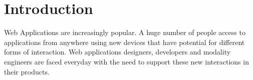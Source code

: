 \documentclass{llncs}
\begin{document}
\mainmatter  %

\title{}
\subtitle{\textbf{Technical Draft}}


%
%
\author{Diego Paez}
%


%
%

\maketitle


\begin{abstract}
Here we are introducing a novel platform that expands, what we called, the common set of interactions on web applications. Further more, this platform not only helps to increase this set, but also adds multimodal interactions capabilities to web applications. The way the multimodal interaction is supported is based on a different approach introduced here as a distributed fusion system.
\end{abstract}

\section{Introduction}
Web Applications are increasingly popular. A huge number of people access to applications from anywhere using new devices that have potential for different forms of interaction. Web applications designers, developers and modality engineers are faced everyday with the need to support these new interactions in their products.
\end{document}
